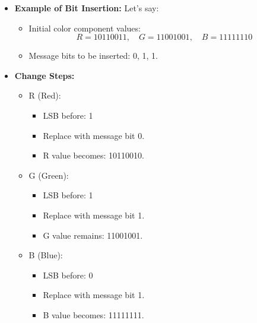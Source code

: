 \documentclass{ittelkom}
\begin{document}
\begin{enumerate}
\begin{enumerate}
                    \begin{itemize}
                        \item \textbf{Example of Bit Insertion:}
                              Let's say:
                              \begin{itemize}
                                  \item Initial color component values:
                                        \[
                                            R = 10110011, \quad G = 11001001, \quad B = 11111110
                                        \]
                                  \item Message bits to be inserted: 0, 1, 1.
                              \end{itemize}

                        \item \textbf{Change Steps:}
                              \begin{itemize}
                                  \item R (Red):
                                        \begin{itemize}
                                            \item LSB before: 1
                                            \item Replace with message bit 0.
                                            \item R value becomes: 10110010.
                                        \end{itemize}
                                  \item G (Green):
                                        \begin{itemize}
                                            \item LSB before: 1
                                            \item Replace with message bit 1.
                                            \item G value remains: 11001001.
                                        \end{itemize}
                                  \item B (Blue):
                                        \begin{itemize}
                                            \item LSB before: 0
                                            \item Replace with message bit 1.
                                            \item B value becomes: 11111111.
                                        \end{itemize}
                              \end{itemize}


\end{itemize}
\end{enumerate}
\end{enumerate}
\end{document}
